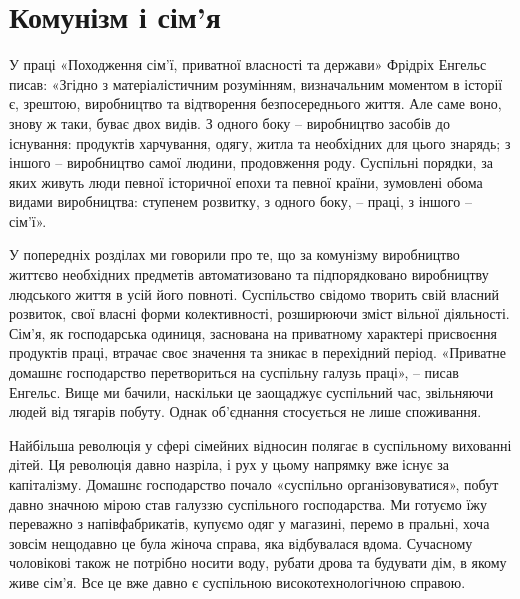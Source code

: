 \documentclass[../main]{subfiles}
\begin{document}
\ifSubfilesClassLoaded{\setcounter{page}{50}}{}
\section{Комунізм і сім’я}
\label{sec:09_kommunizm_semya}

У праці «Походження сім’ї, приватної власності та держави» Фрідріх Енгельс писав: «Згідно з матеріалістичним розумінням, визначальним моментом в історії є, зрештою, виробництво та відтворення безпосереднього життя. Але саме воно, знову ж таки, буває двох видів. З одного боку – виробництво засобів до існування: продуктів харчування, одягу, житла та необхідних для цього знарядь; з іншого – виробництво самої людини, продовження роду. Суспільні порядки, за яких живуть люди певної історичної епохи та певної країни, зумовлені обома видами виробництва: ступенем розвитку, з одного боку, – праці, з іншого – сім’ї».

У попередніх розділах ми говорили про те, що за комунізму виробництво життєво необхідних предметів автоматизовано та підпорядковано виробництву людського життя в усій його повноті. Суспільство свідомо творить свій власний розвиток, свої власні форми колективності, розширюючи зміст вільної діяльності. Сім’я, як господарська одиниця, заснована на приватному характері присвоєння продуктів праці, втрачає своє значення та зникає в перехідний період. «Приватне домашнє господарство перетвориться на суспільну галузь праці», – писав Енгельс. Вище ми бачили, наскільки це заощаджує суспільний час, звільняючи людей від тягарів побуту. Однак об’єднання стосується не лише споживання.

Найбільша революція у сфері сімейних відносин полягає в суспільному вихованні дітей. Ця революція давно назріла, і рух у цьому напрямку вже існує за капіталізму. Домашнє господарство почало «суспільно організовуватися», побут давно значною мірою став галуззю суспільного господарства. Ми готуємо їжу переважно з напівфабрикатів, купуємо одяг у магазині, перемо в пральні, хоча зовсім нещодавно це була жіноча справа, яка відбувалася вдома. Сучасному чоловікові також не потрібно носити воду, рубати дрова та будувати дім, в якому живе сім’я. Все це вже давно є суспільною високотехнологічною справою.
\end{document}
